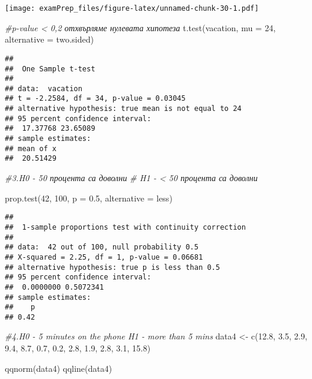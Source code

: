 \documentclass[
]{article}
\newenvironment{Shaded}{\begin{snugshade}}{\end{snugshade}}
\newcommand{\AttributeTok}[1]{\textcolor[rgb]{0.77,0.63,0.00}{#1}}
\newcommand{\CommentTok}[1]{\textcolor[rgb]{0.56,0.35,0.01}{\textit{#1}}}
\newcommand{\DecValTok}[1]{\textcolor[rgb]{0.00,0.00,0.81}{#1}}
\newcommand{\FloatTok}[1]{\textcolor[rgb]{0.00,0.00,0.81}{#1}}
\newcommand{\FunctionTok}[1]{\textcolor[rgb]{0.00,0.00,0.00}{#1}}
\newcommand{\NormalTok}[1]{#1}
\newcommand{\OtherTok}[1]{\textcolor[rgb]{0.56,0.35,0.01}{#1}}
\newcommand{\StringTok}[1]{\textcolor[rgb]{0.31,0.60,0.02}{#1}}
\begin{document}
\texttt{[image: examPrep\_files/figure-latex/unnamed-chunk-30-1.pdf]}

\begin{Shaded}
\begin{Highlighting}[]
\CommentTok{\#p{-}value \textless{} 0,2 отхвърляме нулевата хипотеза}
\FunctionTok{t.test}\NormalTok{(vacation, }\AttributeTok{mu =} \DecValTok{24}\NormalTok{, }\AttributeTok{alternative =} \StringTok{\textquotesingle{}two.sided\textquotesingle{}}\NormalTok{)}
\end{Highlighting}
\end{Shaded}

\begin{verbatim}
## 
##  One Sample t-test
## 
## data:  vacation
## t = -2.2584, df = 34, p-value = 0.03045
## alternative hypothesis: true mean is not equal to 24
## 95 percent confidence interval:
##  17.37768 23.65089
## sample estimates:
## mean of x 
##  20.51429
\end{verbatim}

\begin{Shaded}
\begin{Highlighting}[]
\CommentTok{\#3.H0 {-} 50 процента са доволни}
\CommentTok{\# H1 {-} \textless{} 50 процента са доволни}

\FunctionTok{prop.test}\NormalTok{(}\DecValTok{42}\NormalTok{, }\DecValTok{100}\NormalTok{, }\AttributeTok{p =} \FloatTok{0.5}\NormalTok{, }\AttributeTok{alternative =} \StringTok{\textquotesingle{}less\textquotesingle{}}\NormalTok{)}
\end{Highlighting}
\end{Shaded}

\begin{verbatim}
## 
##  1-sample proportions test with continuity correction
## 
## data:  42 out of 100, null probability 0.5
## X-squared = 2.25, df = 1, p-value = 0.06681
## alternative hypothesis: true p is less than 0.5
## 95 percent confidence interval:
##  0.0000000 0.5072341
## sample estimates:
##    p 
## 0.42
\end{verbatim}

\begin{Shaded}
\begin{Highlighting}[]
\CommentTok{\#4.H0 {-} 5 minutes on the phone H1 {-} more than 5 mins}
\NormalTok{data4 }\OtherTok{\textless{}{-}} \FunctionTok{c}\NormalTok{(}\FloatTok{12.8}\NormalTok{, }\FloatTok{3.5}\NormalTok{, }\FloatTok{2.9}\NormalTok{, }\FloatTok{9.4}\NormalTok{, }\FloatTok{8.7}\NormalTok{, }\FloatTok{0.7}\NormalTok{, }\FloatTok{0.2}\NormalTok{, }\FloatTok{2.8}\NormalTok{, }\FloatTok{1.9}\NormalTok{, }\FloatTok{2.8}\NormalTok{, }\FloatTok{3.1}\NormalTok{, }\FloatTok{15.8}\NormalTok{)}

\FunctionTok{qqnorm}\NormalTok{(data4)}
\FunctionTok{qqline}\NormalTok{(data4)}
\end{Highlighting}
\end{Shaded}
\end{document}
